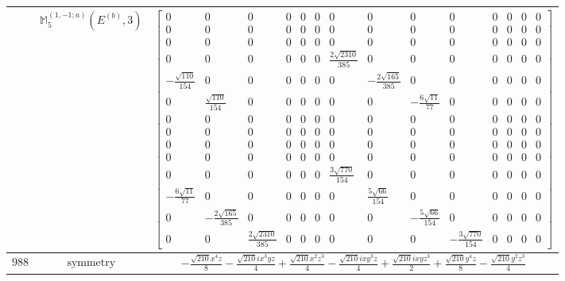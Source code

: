 \documentclass[fleqn,8pt,landscape]{jsarticle}
\begin{document}
\begin{longtable}{ccc}
$  $ & $ \mathbb{M}_{5}^{(1,-1;a)}(E^{(b)},3) $ & $ \begin{bmatrix} 0 & 0 & 0 & 0 & 0 & 0 & 0 & 0 & 0 & 0 & 0 & 0 & 0 & 0 \\ 0 & 0 & 0 & 0 & 0 & 0 & 0 & 0 & 0 & 0 & 0 & 0 & 0 & 0 \\ 0 & 0 & 0 & 0 & 0 & 0 & 0 & 0 & 0 & 0 & 0 & 0 & 0 & 0 \\ 0 & 0 & 0 & 0 & 0 & 0 & \frac{2 \sqrt{2310}}{385} & 0 & 0 & 0 & 0 & 0 & 0 & 0 \\ - \frac{\sqrt{110}}{154} & 0 & 0 & 0 & 0 & 0 & 0 & - \frac{2 \sqrt{165}}{385} & 0 & 0 & 0 & 0 & 0 & 0 \\ 0 & \frac{\sqrt{110}}{154} & 0 & 0 & 0 & 0 & 0 & 0 & - \frac{6 \sqrt{11}}{77} & 0 & 0 & 0 & 0 & 0 \\ 0 & 0 & 0 & 0 & 0 & 0 & 0 & 0 & 0 & 0 & 0 & 0 & 0 & 0 \\ 0 & 0 & 0 & 0 & 0 & 0 & 0 & 0 & 0 & 0 & 0 & 0 & 0 & 0 \\ 0 & 0 & 0 & 0 & 0 & 0 & 0 & 0 & 0 & 0 & 0 & 0 & 0 & 0 \\ 0 & 0 & 0 & 0 & 0 & 0 & 0 & 0 & 0 & 0 & 0 & 0 & 0 & 0 \\ 0 & 0 & 0 & 0 & 0 & 0 & \frac{3 \sqrt{770}}{154} & 0 & 0 & 0 & 0 & 0 & 0 & 0 \\ - \frac{6 \sqrt{11}}{77} & 0 & 0 & 0 & 0 & 0 & 0 & \frac{5 \sqrt{66}}{154} & 0 & 0 & 0 & 0 & 0 & 0 \\ 0 & - \frac{2 \sqrt{165}}{385} & 0 & 0 & 0 & 0 & 0 & 0 & - \frac{5 \sqrt{66}}{154} & 0 & 0 & 0 & 0 & 0 \\ 0 & 0 & \frac{2 \sqrt{2310}}{385} & 0 & 0 & 0 & 0 & 0 & 0 & - \frac{3 \sqrt{770}}{154} & 0 & 0 & 0 & 0 \end{bmatrix} $ \\ \hline
$ 988 $ & $ \text{symmetry} $ & $ - \frac{\sqrt{210} x^{4} z}{8} - \frac{\sqrt{210} i x^{3} y z}{4} + \frac{\sqrt{210} x^{2} z^{3}}{4} - \frac{\sqrt{210} i x y^{3} z}{4} + \frac{\sqrt{210} i x y z^{3}}{2} + \frac{\sqrt{210} y^{4} z}{8} - \frac{\sqrt{210} y^{2} z^{3}}{4} $ \\

\end{longtable}
\end{document}
